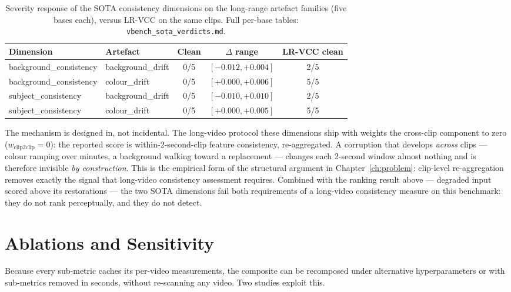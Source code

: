 \begin{table}[h]
\centering
\caption{Severity response of the SOTA consistency dimensions on the
long-range artefact families (five bases each), versus LR-VCC on the same
clips. Full per-base tables: \texttt{vbench\_sota\_verdicts.md}.}
\label{tab:exp:sotaseverity}
\small
\begin{tabular}{llccc}
\hline
\textbf{Dimension} & \textbf{Artefact} & \textbf{Clean} & \textbf{$\Delta$ range} & \textbf{LR-VCC clean} \\
\hline
background\_consistency & background\_drift & 0/5 & $[-0.012, +0.004]$ & 2/5 \\
background\_consistency & colour\_drift & 0/5 & $[+0.000, +0.006]$ & 5/5 \\
subject\_consistency & background\_drift & 0/5 & $[-0.010, +0.010]$ & 2/5 \\
subject\_consistency & colour\_drift & 0/5 & $[+0.000, +0.005]$ & 5/5 \\
\hline
\end{tabular}
\end{table}

The mechanism is designed in, not incidental. The long-video protocol these
dimensions ship with weights the cross-clip component to zero
($w_{\mathrm{clip2clip}}{=}0$): the reported score is within-2-second-clip
feature consistency, re-aggregated. A corruption that develops \emph{across}
clips --- colour ramping over minutes, a background walking toward a
replacement --- changes each 2-second window almost nothing and is therefore
invisible \emph{by construction}. This is the empirical form of the
structural argument in Chapter~\ref{ch:problem}: clip-level re-aggregation
removes exactly the signal that long-video consistency assessment requires.
Combined with the ranking result above --- degraded input scored above its
restorations --- the two SOTA dimensions fail both requirements of a
long-video consistency measure on this benchmark: they do not rank
perceptually, and they do not detect.

\section{Ablations and Sensitivity}
\label{sec:exp:ablations}

Because every sub-metric caches its per-video measurements, the composite can
be recomposed under alternative hyperparameters or with sub-metrics removed in
seconds, without re-scanning any video. Two studies exploit this.

